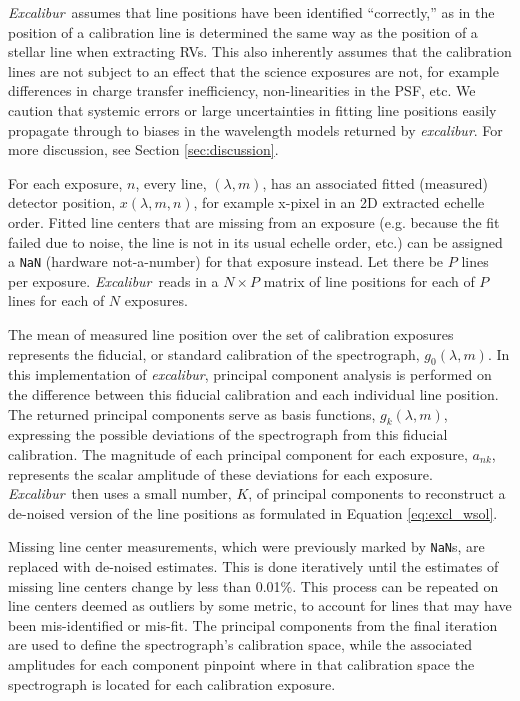 \documentclass[twocolumn,table,xcolor,trackchanges]{aastex63}
\newcommand{\project}[1]{\textsl{#1}}
\newcommand{\name}{\project{excalibur}}
\newcommand{\Name}{\project{Excalibur}}
\newcommand{\code}[1]{\texttt{#1}}
\begin{document}
\Name\ assumes that line positions have been identified ``correctly,'' as in the position of a calibration line is determined the same way as the position of a stellar line when extracting RVs.  This also inherently assumes that the calibration lines are not subject to an effect that the science exposures are not, for example differences in charge transfer inefficiency, non-linearities in the PSF, etc.  We caution that systemic errors or large uncertainties in fitting line positions easily propagate through to biases in the wavelength models returned by \name.  For more discussion, see Section \ref{sec:discussion}.

For each exposure, $n$, every line, $(\lambda,m)$, has an associated fitted (measured) detector position, $x(\lambda,m,n)$, for example x-pixel in an 2D extracted echelle order.  Fitted line centers that are missing from an exposure (e.g. because the fit failed due to noise, the line is not in its usual echelle order, etc.) can be assigned a \code{NaN} (hardware not-a-number) for that exposure instead.  Let there be $P$ lines per exposure.  \Name\ reads in a $N \times P$ matrix of line positions for each of $P$ lines for each of $N$ exposures.

The mean of measured line position over the set of calibration exposures represents the fiducial, or standard calibration of the spectrograph, $g_0(\lambda,m)$.  In this implementation of \name, principal component analysis is performed on the difference between this fiducial calibration and each individual line position.  The returned principal components serve as basis functions,  $g_k(\lambda,m)$, expressing the possible deviations of the spectrograph from this fiducial calibration.  The magnitude of each principal component for each exposure, $a_{nk}$, represents the scalar amplitude of these deviations for each exposure.  \Name\ then uses a small number, $K$, of principal components to reconstruct a de-noised version of the line positions as formulated in Equation \ref{eq:excl_wsol}.

Missing line center measurements, which were previously marked by \code{NaN}s, are replaced with de-noised estimates.  This is done iteratively until the estimates of missing line centers change by less than 0.01\%.  This process can be repeated on line centers deemed as outliers by some metric, to account for lines that may have been mis-identified or mis-fit.  The principal components from the final iteration are used to define the spectrograph's calibration space, while the associated amplitudes for each component pinpoint where in that calibration space the spectrograph is located for each calibration exposure.
\end{document}
